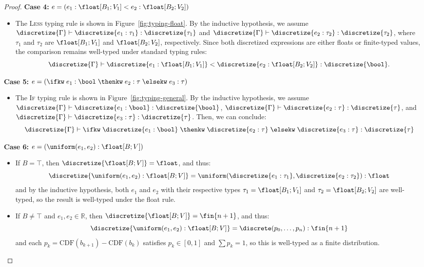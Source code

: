 \begin{proof}
    \textbf{Case 4:} $e = (e_1 : \float[B_1; V_1] < e_2 : \float[B_2; V_2])$
    \begin{itemize}
        \item The \textsc{Less} typing rule is shown in Figure~\ref{fig:typing-float}. By the inductive hypothesis, we assume $\discretize{\Gamma} \vdash \discretize{e_1 : \tau_1} : \discretize{\tau_1}$ and $\discretize{\Gamma} \vdash \discretize{e_2 : \tau_2} : \discretize{\tau_2}$, where $\tau_1$ and $\tau_2$ are $\float[B_1;V_1]$ and $\float[B_2;V_2]$, respectively. Since both discretized expressions are either floats or finite-typed values, the comparison remains well-typed under standard typing rules:
        \[
        \discretize{\Gamma} \vdash \discretize{e_1 : \float[B_1; V_1]} < \discretize{e_2 : \float[B_2; V_2]} : \discretize{\bool}.
        \]
    \end{itemize}

    \textbf{Case 5:} $e = (\ifkw\; e_1 : \bool \; \thenkw\; e_2 : \tau \; \elsekw\; e_3 : \tau)$

    \begin{itemize}
        \item The \textsc{If} typing rule is shown in Figure~\ref{fig:typing-general}. By the inductive hypothesis, we assume $\discretize{\Gamma} \vdash \discretize{e_1 : \bool} : \discretize{\bool}$, $\discretize{\Gamma} \vdash \discretize{e_2 : \tau} : \discretize{\tau}$, and $ \discretize{\Gamma} \vdash \discretize{e_3 : \tau} : \discretize{\tau}$. Then, we can conclude:
        \[
            \discretize{\Gamma} \vdash \ifkw\; \discretize{e_1 : \bool} \; \thenkw\; \discretize{e_2 : \tau} \; \elsekw\; \discretize{e_3 : \tau} : \discretize{\tau}
        \]
    \end{itemize}

    \textbf{Case 6:} $e = (\uniform(e_1, e_2) : \float[B;V])$

    \begin{itemize}
        \item If $B = \top$, then $\discretize{\float[B;V]} = \float$, and thus:
        \[
            \discretize{\uniform(e_1, e_2) : \float[B;V]} = \uniform(\discretize{e_1 : \tau_1}, \discretize{e_2 : \tau_2}) : \float
        \]
        and by the inductive hypothesis, both $e_1$ and $e_2$ with their respective types $\tau_1 = \float[B_1; V_1]$ and $\tau_2 = \float[B_2; V_2]$ are well-typed, so the result is well-typed under the float rule.

        \item If $B \neq \top$ and $e_1, e_2 \in \mathbb{R}$, then $\discretize{\float[B;V]} = \fin{n+1}$, and thus:
        \[
            \discretize{\uniform(e_1, e_2) : \float[B;V]} = \discrete(p_0, \ldots, p_n) : \fin{n+1}
        \]
        and each $p_k = \text{CDF}(b_{k+1}) - \text{CDF}(b_k)$ satisfies $p_k \in [0,1]$ and $\sum p_k = 1$, so this is well-typed as a finite distribution.


\end{itemize}
\end{proof}
